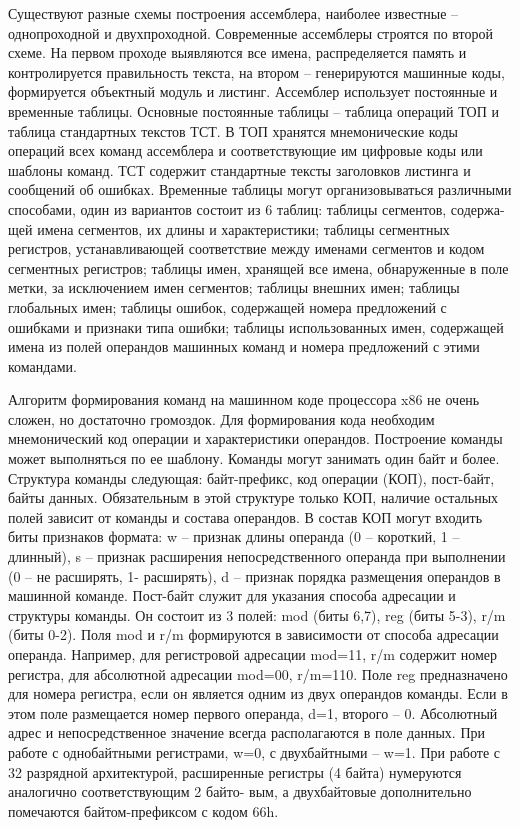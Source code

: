 Существуют разные схемы построения ассемблера, наиболее известные – однопроходной и двухпроходной. Современные ассемблеры строятся по второй схеме. На первом проходе выявляются все имена, распределяется память и контролируется правильность текста, на втором – генерируются машинные коды, формируется объектный модуль и листинг. Ассемблер использует постоянные и временные таблицы. Основные постоянные таблицы – таблица операций ТОП и таблица стандартных текстов ТСТ. В ТОП хранятся мнемонические коды операций всех команд ассемблера и соответствующие им цифровые коды или шаблоны команд. ТСТ содержит стандартные тексты заголовков листинга и сообщений об ошибках. Временные таблицы могут организовываться различными способами, один из вариантов состоит из 6 таблиц: таблицы сегментов, содержа- щей имена сегментов, их длины и характеристики; таблицы сегментных регистров, устанавливающей соответствие между именами сегментов и кодом сегментных регистров; таблицы имен, хранящей все имена, обнаруженные в поле метки, за исключением имен сегментов; таблицы внешних имен; таблицы глобальных имен; таблицы ошибок, содержащей номера предложений с ошибками и признаки типа ошибки; таблицы использованных имен, содержащей имена из полей операндов машинных команд и номера предложений с этими командами.

Алгоритм формирования команд на машинном коде процессора x86 не очень сложен, но достаточно громоздок. Для формирования кода необходим мнемонический код операции и характеристики операндов. Построение команды может выполняться по ее шаблону. Команды могут занимать один байт и более. Структура команды следующая: байт-префикс, код операции (КОП), пост-байт, байты данных. Обязательным в этой структуре только КОП, наличие остальных полей зависит от команды и состава операндов. В состав КОП могут входить биты признаков формата: w – признак длины операнда (0 – короткий, 1 – длинный), s – признак расширения непосредственного операнда при выполнении (0 – не расширять, 1- расширять), d – признак порядка размещения операндов в машинной команде. Пост-байт служит для указания способа адресации и структуры команды. Он состоит из 3 полей: mod (биты 6,7), reg (биты 5-3), r/m (биты 0-2). Поля mod и r/m формируются в зависимости от способа адресации операнда. Например, для регистровой адресации mod=11, r/m содержит номер регистра, для абсолютной адресации mod=00, r/m=110. Поле reg предназначено для номера регистра, если он является одним из двух операндов команды. Если в этом поле размещается номер первого операнда, d=1, второго – 0. Абсолютный адрес и непосредственное значение всегда располагаются в поле данных. При работе с однобайтными регистрами, w=0, с двухбайтными – w=1. При работе с 32 разрядной архитектурой, расширенные регистры (4 байта) нумеруются аналогично соответствующим 2 байто- вым, а двухбайтовые дополнительно помечаются байтом-префиксом с кодом 66h.

